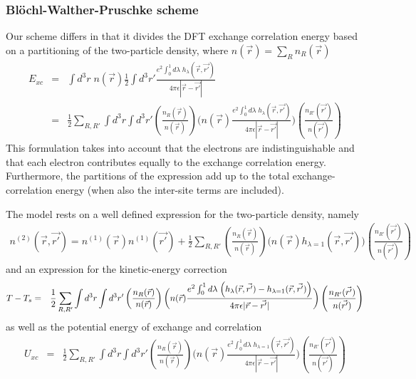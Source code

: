 \documentclass[11pt,a4paper]{report}
\begin{document}
\subsubsection{Bl\"ochl-Walther-Pruschke scheme}
Our scheme\cite{bloechl11_prb84_205101} differs in that it divides the
DFT exchange correlation energy based on a partitioning of the
two-particle density, where $n(\vec{r})=\sum_R n_R(\vec{r})$
\begin{eqnarray}
E_{xc}
&=&\int d^3r\;n(\vec{r})
\frac{1}{2}\int d^3r'\frac{e^2 \int_0^1d\lambda\;h_\lambda (\vec{r},\vec{r'})}
{4\pi\epsilon|\vec{r}-\vec{r'}|}
\nonumber\\
&=&\frac{1}{2}\sum_{R,R'}\int d^3r\int d^3r'
\left(\frac{n_R(\vec{r})}{n(\vec{r})}\right)
\biggl(
n(\vec{r})
\frac{e^2 \int_0^1d\lambda\;h_\lambda (\vec{r},\vec{r'})}
{4\pi\epsilon|\vec{r}-\vec{r'}|}\biggr)
\left(\frac{n_{R'}(\vec{r'})}{n(\vec{r'})}\right)
\end{eqnarray}
This formulation takes into account that the electrons are
indistinguishable and that each electron contributes equally to the
exchange correlation energy. Furthermore, the partitions of the
expression add up to the total exchange-correlation energy (when also
the inter-site terms are included).

The model rests on a well defined expression for the two-particle
density, namely
\begin{eqnarray}
n^{(2)}(\vec{r},\vec{r'})=n^{(1)}(\vec{r})n^{(1)}(\vec{r'})
+
\frac{1}{2}\sum_{R,R'}
\left(\frac{n_R(\vec{r})}{n(\vec{r})}\right)
\biggl(
n(\vec{r})h_{\lambda=1} (\vec{r},\vec{r'})
\biggr)
\left(\frac{n_{R'}(\vec{r'})}{n(\vec{r'})}\right)
\end{eqnarray}
and an expression for the kinetic-energy correction 
\begin{eqnarray}
T-T_s
&=&\frac{1}{2}\sum_{R,R'}\int d^3r\int d^3r'
\left(\frac{n_R(\vec{r})}{n(\vec{r})}\right)
\biggl(
n(\vec{r})
\frac{e^2 \int_0^1d\lambda\;\Bigl(h_\lambda (\vec{r},\vec{r'})
-h_{\lambda=1} (\vec{r},\vec{r'})\Bigr)}
{4\pi\epsilon|\vec{r}-\vec{r'}|}\biggr)
\left(\frac{n_{R'}(\vec{r'})}{n(\vec{r'})}\right)
\nonumber\\
\end{eqnarray}
as well as the potential energy of exchange and correlation
\begin{eqnarray}
U_{xc}
&=&\frac{1}{2}\sum_{R,R'}\int d^3r\int d^3r'
\left(\frac{n_R(\vec{r})}{n(\vec{r})}\right)
\biggl(
n(\vec{r})
\frac{e^2 \int_0^1d\lambda\;h_{\lambda=1} (\vec{r},\vec{r'})}
{4\pi\epsilon|\vec{r}-\vec{r'}|}\biggr)
\left(\frac{n_{R'}(\vec{r'})}{n(\vec{r'})}\right)
\nonumber\\
\end{eqnarray}
\end{document}
